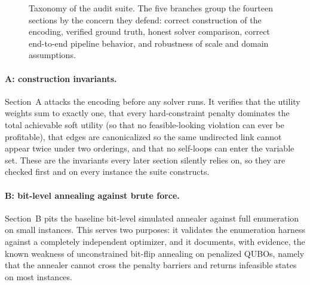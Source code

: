 \begin{figure}[t]
  \centering
  \caption{Taxonomy of the audit suite. The five branches group the
  fourteen sections by the concern they defend: correct construction of
  the encoding, verified ground truth, honest solver comparison, correct
  end-to-end pipeline behavior, and robustness of scale and domain
  assumptions.}
  \label{fig:audittaxonomy}
\end{figure}

\paragraph{A: construction invariants.}
Section~A attacks the encoding before any solver runs. It verifies that the
utility weights sum to exactly one, that every hard-constraint penalty
dominates the total achievable soft utility (so that no feasible-looking
violation can ever be profitable), that edges are canonicalized so the same
undirected link cannot appear twice under two orderings, and that no
self-loops can enter the variable set. These are the invariants every later
section silently relies on, so they are checked first and on every
instance the suite constructs.

\paragraph{B: bit-level annealing against brute force.}
Section~B pits the baseline bit-level simulated annealer against full
enumeration on small instances. This serves two purposes: it validates the
enumeration harness against a completely independent optimizer, and it
documents, with evidence, the known weakness of unconstrained bit-flip
annealing on penalized QUBOs, namely that the annealer cannot cross the
penalty barriers and returns infeasible states on most instances.

